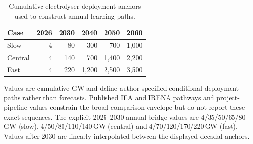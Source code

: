 \documentclass[pdflatex,sn-nature]{sn-jnl}
\begin{document}
\begin{table}[!ht]
\caption{Cumulative electrolyser-deployment anchors used to construct annual learning paths.}\label{tab:deployment}
\centering
\footnotesize
\begin{tabular}{lrrrrr}
\toprule
Case & 2026 & 2030 & 2040 & 2050 & 2060 \\
\midrule
Slow & 4 & 80 & 300 & 700 & 1,000 \\
Central & 4 & 140 & 700 & 1,400 & 2,200 \\
Fast & 4 & 220 & 1,200 & 2,500 & 3,500 \\
\bottomrule
\end{tabular}
\begin{flushleft}\footnotesize
Values are cumulative GW and define author-specified conditional deployment paths rather than forecasts. Published IEA and IRENA pathways and project-pipeline values constrain the broad comparison envelope but do not report these exact sequences\cite{ieaelectrolysers2024,iea2023nze,iea2021minerals,irena2023}. The explicit 2026--2030 annual bridge values are 4/35/50/65/80\,GW (slow), 4/50/80/110/140\,GW (central) and 4/70/120/170/220\,GW (fast). Values after 2030 are linearly interpolated between the displayed decadal anchors.
\end{flushleft}
\end{table}
\end{document}
